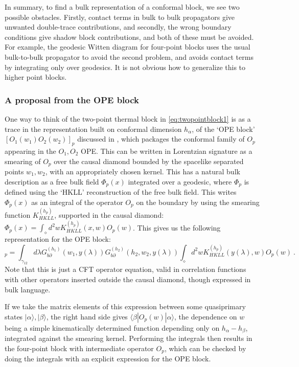 \documentclass[12pt]{article}
\def\p{\partial}
\begin{document}
In summary, to find a bulk representation of a conformal block, we see two possible obstacles. Firstly, contact terms in bulk to bulk propagators give unwanted double-trace contributions, and secondly, the wrong boundary conditions give shadow block contributions, and both of these must be avoided. For example, the geodesic Witten diagram for four-point blocks uses the usual bulk-to-bulk propagator to avoid the second problem, and avoids contact terms by integrating only over geodesics. It is not obvious how to generalize this to higher point blocks.

\subsubsection*{A proposal from the OPE block}

One way to think of the two-point thermal block in \cref{eq:twopointblock1} is as a trace in the representation built on conformal dimension $h_\alpha$, of the `OPE block' $[O_1(w_1)O_2(w_2)]_p$ discussed in \cite{Czech:2016xec}, which packages the conformal family of $O_p$ appearing in the $O_1,O_2$ OPE. This can be written in Lorentzian signature as a smearing of $O_p$ over the causal diamond bounded by the spacelike separated points $w_1,w_2$, with an appropriately chosen kernel. This has a natural bulk description as a free bulk field $\Phi_p(x)$ integrated over a geodesic, where $\Phi_p$ is defined using the `HKLL' reconstruction \cite{Hamilton:2006az,Hamilton:2006fh} of the free bulk field. This writes $\Phi_p(x)$ as an integral of the operator $O_p$ on the boundary by using the smearing function $K^{(h_p)}_{HKLL}$, supported in the causal diamond: $\Phi_p(x) =\int_\diamond\! d^2w K^{(h_p)}_{HKLL}(x,w) O_p(w)$. This gives us the following representation for the OPE block:
%
\begin{equation}
[O_1(w_1)O_2(w_2)]_p  = \int_{\gamma_{12}} \! d\lambda G^{(h_1)}_{b\p}(w_1,y(\lambda)) G^{(h_2)}_{b\p}(h_2,w_2,y(\lambda))\int_\diamond\! d^2w K^{(h_p)}_{HKLL}(y(\lambda),w) O_p(w)~.
\end{equation}
%
Note that this is just a CFT operator equation, valid in correlation functions with other operators inserted outside the causal diamond, though expressed in bulk language.

If we take the matrix elements of this expression between some quasiprimary states $|\alpha\rangle,|\beta\rangle$, the right hand side gives $\langle\beta|O_p(w)|\alpha\rangle$, the dependence on $w$ being a simple kinematically determined function depending only on $h_\alpha-h_\beta$, integrated against the smearing kernel. Performing the integrals then results in the four-point block with intermediate operator $O_p$, which can be checked by doing the integrals with an explicit expression for the OPE block.
\end{document}
